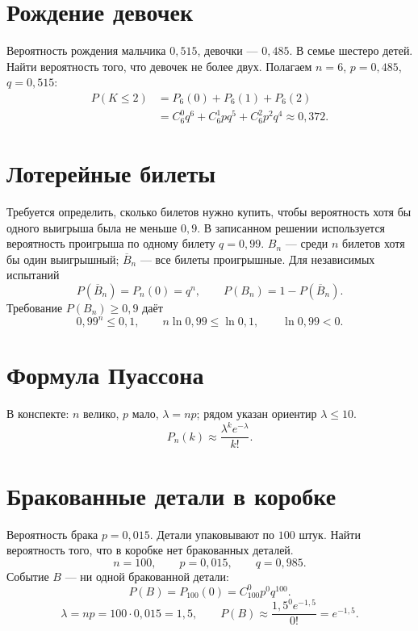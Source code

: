 \section*{Рождение девочек}
Вероятность рождения мальчика $0{,}515$, девочки --- $0{,}485$.
В семье шестеро детей. Найти вероятность того, что девочек не более двух.
Полагаем $n=6$, $p=0{,}485$, $q=0{,}515$:
\begin{align*}
 P(K\le2)&=P_6(0)+P_6(1)+P_6(2)\\
 &=C_6^0q^6+C_6^1pq^5+C_6^2p^2q^4\approx0{,}372.
\end{align*}

\section*{Лотерейные билеты}
Требуется определить, сколько билетов нужно купить, чтобы вероятность
хотя бы одного выигрыша была не меньше $0{,}9$.
В записанном решении используется вероятность проигрыша по одному билету $q=0{,}99$.
$B_n$ --- среди $n$ билетов хотя бы один выигрышный;
$\overline B_n$ --- все билеты проигрышные.
Для независимых испытаний
\[
 P(\overline B_n)=P_n(0)=q^n,\qquad
 P(B_n)=1-P(\overline B_n).
\]
Требование $P(B_n)\ge0{,}9$ даёт
\[
 0{,}99^n\le0{,}1,\qquad n\ln0{,}99\le\ln0{,}1,\qquad \ln0{,}99<0.
\]

\section*{Формула Пуассона}
В конспекте: $n$ велико, $p$ мало, $\lambda=np$; рядом указан ориентир
$\lambda\le10$.
\[
 \boxed{P_n(k)\approx\frac{\lambda^k e^{-\lambda}}{k!}.}
\]
\section*{Бракованные детали в коробке}
Вероятность брака $p=0{,}015$. Детали упаковывают по $100$ штук.
Найти вероятность того, что в коробке нет бракованных деталей.
\[
 n=100,\qquad p=0{,}015,\qquad q=0{,}985.
\]
Событие $B$ --- ни одной бракованной детали:
\[
 P(B)=P_{100}(0)=C_{100}^0p^0q^{100}.
\]
\[
 \lambda=np=100\cdot0{,}015=1{,}5,\qquad
 P(B)\approx\frac{1{,}5^0e^{-1{,}5}}{0!}=e^{-1{,}5}.
\]

